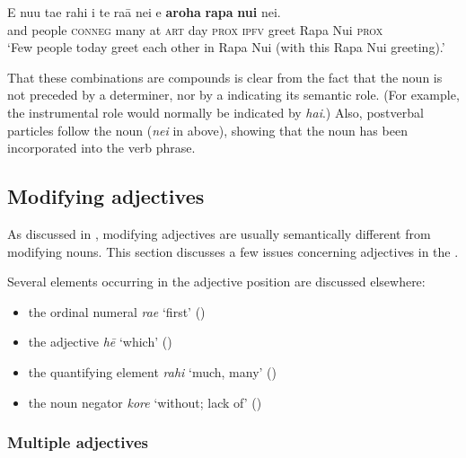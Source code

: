 \ea\label{ex:5.134}
\gll {\ꞌ}E nu{\ꞌ}u ta{\ꞌ}e rahi {\ꞌ}i te ra{\ꞌ}ā nei e \textbf{{\ꞌ}aroha} \textbf{rapa} \textbf{nui} nei. \\
and people \textsc{conneg} many at \textsc{art} day \textsc{prox} \textsc{ipfv} greet Rapa Nui \textsc{prox} \\

\glt
‘Few people today greet each other in Rapa Nui (with this Rapa Nui greeting).’ \textstyleExampleref{[R530.038]} 
\z

That these combinations are compounds is clear from the fact that the noun is not preceded by a determiner, nor by a  indicating its semantic role. (For example, the instrumental role would normally be indicated by \textit{hai}.) Also, postverbal particles follow the noun (\textit{nei} in  above), showing that the noun has been incorporated into the verb phrase.
\subsection{Modifying adjectives}\label{sec:5.7.3}
As discussed in , modifying adjectives are usually semantically different from modifying nouns. This section discusses a few issues concerning adjectives in the .

Several elements occurring in the adjective position are discussed elsewhere:

\begin{itemize}
\item 
the ordinal numeral \textit{ra{\ꞌ}e} ‘first’ ()

\item 
the  adjective \textit{h}\textit{ē} ‘which’ ()

\item 
the quantifying element \textit{rahi} ‘much, many’ ()

\item 
the noun negator \textit{kore} ‘without; lack of’ ()

\end{itemize}
\subsubsection[Multiple adjectives]{Multiple adjectives}\label{sec:5.7.3.1}

